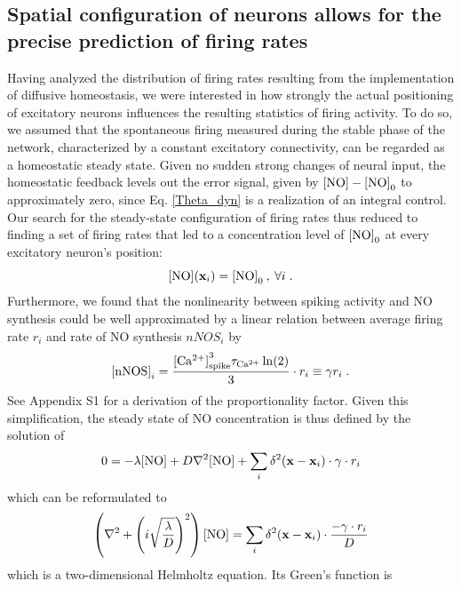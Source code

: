 \documentclass[10pt,letterpaper]{article}
\begin{document}
\subsection*{Spatial configuration of neurons allows for the precise prediction of firing rates}\label{Section_Rand_Mat_vs_Sim}
Having analyzed the distribution of firing rates resulting from the implementation of diffusive homeostasis, we were interested in how strongly the actual positioning of excitatory neurons influences the resulting statistics of firing activity. To do so, we assumed that the spontaneous firing measured during the stable phase of the network, characterized by a constant excitatory connectivity, can be regarded as a homeostatic steady state. Given no sudden strong changes of neural input, the homeostatic feedback levels out the error signal, given by ${\rm [NO]} - {\rm [NO]}_0$ to approximately zero, since Eq. \ref{Theta_dyn} is a realization of an integral control. Our search for the steady-state configuration of firing rates thus reduced to finding a set of firing rates that led to a concentration level of ${\rm [NO]}_0$ at every excitatory neuron's position:
\begin{equation}
{\rm [NO]}(\mathbf{x}_{i}) = {\rm [NO]}_0 \:, \: \forall i \; .
\label{NO_equil_cond}
\end{equation}
Furthermore, we found that the nonlinearity between spiking activity and NO synthesis could be well approximated by a linear relation between average firing rate $r_i$ and rate of NO synthesis $nNOS_i$ by
\begin{equation}
{\rm [nNOS]}_i = \frac{{\rm [Ca^{2+}]}^3_{\rm spike} \tau_{\rm Ca^{2+}}\ln(2)}{3} \cdot r_i \equiv \gamma r_i \; .
\label{simpl_nNOS}
\end{equation}
See Appendix S1 for a derivation of the proportionality factor. Given this simplification, the steady state of NO concentration is thus defined by the solution of
\begin{equation}
0 =-\lambda {\rm [NO]} + D \nabla^2 {\rm [NO]} + \sum_{i} \delta^2(\mathbf{x}-\mathbf{x}_{i})\cdot \gamma \cdot r_i \label{simple_NO_dyn_with_diff}
\end{equation}
which can be reformulated to
\begin{equation}
\left(\nabla^2 + \left( i\sqrt{\frac{\lambda}{D}}\right)^2\right) {\rm [NO]} = \sum_{i} \delta^2(\mathbf{x}-\mathbf{x}_{i})\cdot \frac{- \gamma \cdot r_i}{D}
\label{simple_NO_dyn_with_diff_equil_helmholtz}
\end{equation}
which is a two-dimensional Helmholtz equation. Its Green's function is
\end{document}
